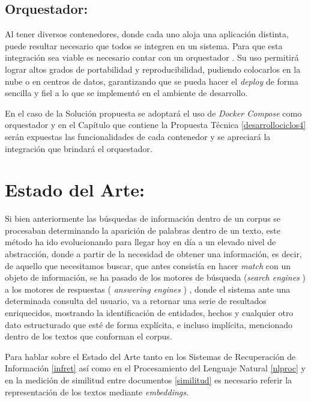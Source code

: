 \documentclass[
  10,
  openany]{book}
\begin{document}
\hypertarget{orquestador}{%
\subsection{Orquestador:}\label{orquestador}}

Al tener diversos contenedores, donde cada uno aloja una aplicación distinta, puede resultar necesario que todos se integren en un sistema. Para que esta integración sea viable es necesario contar con un orquestador \citep{cook2017}. Su uso permitirá lograr altos grados de portabilidad y reproducibilidad, pudiendo colocarlos en la nube o en centros de datos, garantizando que se pueda hacer el \emph{deploy} de forma sencilla y fiel a lo que se implementó en el ambiente de desarrollo.

En el caso de la Solución propuesta se adoptará el uso de \emph{Docker Compose} como orquestador y en el Capítulo que contiene la Propuesta Técnica \ref{desarrollociclos4} serán expuestas las funcionalidades de cada contenedor y se apreciará la integración que brindará el orquestador.

\hypertarget{sota}{%
\section{Estado del Arte:}\label{sota}}

Si bien anteriormente las búsquedas de información dentro de un corpus se procesaban determinando la aparición de palabras dentro de un texto, este método ha ido evolucionando para llegar hoy en día a un elevado nivel de abstracción, donde a partir de la necesidad de obtener una información, es decir, de aquello que necesitamos buscar, que antes consistía en hacer \emph{match} con un objeto de información, se ha pasado de los motores de búsqueda (\emph{search engines} ) a los motores de respuestas ( \emph{answering engines} ) \citep{balog2018}, donde el sistema ante una determinada consulta del usuario, va a retornar una serie de resultados enriquecidos, mostrando la identificación de entidades, hechos y cualquier otro dato estructurado que esté de forma explícita, e incluso implícita, mencionado dentro de los textos que conforman el corpus.

Para hablar sobre el Estado del Arte tanto en los Sistemas de Recuperación de Información \ref{infret} así como en el Procesamiento del Lenguaje Natural \ref{nlproc} y en la medición de similitud entre documentos \ref{similitud} es necesario referir la representación de los textos mediante \emph{embeddings}.
\end{document}

